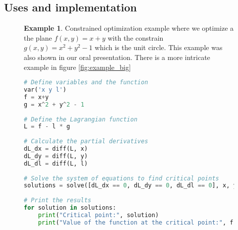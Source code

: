 \documentclass[]{article}
\theoremstyle{definition}
\newtheorem{exmp}{Example}[section]
\begin{document}
\subsection{Uses and implementation}
\begin{figure}[h!!]
	\begin{exmp}
		Constrained optimization example where we optimize a the plane $f(x, y) = x + y$ with the constrain $g(x, y) = x^2 + y^2 -1$ which is the unit circle. This example was also shown in our oral presentation. There is a more intricate example in figure \ref{fig:example_big}
		\begin{lstlisting}[language=python]
# Define variables and the function
var('x y l')
f = x+y
g = x^2 + y^2 - 1
			
# Define the Lagrangian function
L = f - l * g 
			
# Calculate the partial derivatives
dL_dx = diff(L, x)
dL_dy = diff(L, y)
dL_dl = diff(L, l)
			
# Solve the system of equations to find critical points
solutions = solve([dL_dx == 0, dL_dy == 0, dL_dl == 0], x, y, l, solution_dict=True)
			
# Print the results
for solution in solutions:
	print("Critical point:", solution)
	print("Value of the function at the critical point:", f.subs(solution))			
		\end{lstlisting}
		\label{fig:example}
	\end{exmp}
\end{figure}
\end{document}
